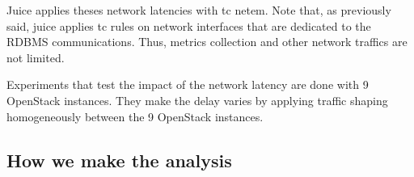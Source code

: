 Juice applies theses network latencies with tc netem. Note that, as previously said, juice applies tc rules on network interfaces that are dedicated to the RDBMS communications. Thus, metrics collection and other network traffics are not limited.

Experiments that test the impact of the network latency are done with 9 OpenStack instances. They make the delay varies by applying traffic shaping homogeneously between the 9 OpenStack instances.

\subsection{How we make the analysis}
